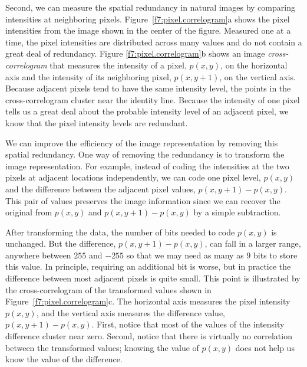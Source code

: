 Second, we can measure the spatial redundancy in natural images by
comparing intensities at neighboring pixels.
Figure~\ref{f7:pixel.correlogram}a shows the pixel intensities from
the image shown in the center of the figure.  Measured one at a time,
the pixel intensities are distributed across many values and do not
contain a great deal of redundancy.  Figure
\ref{f7:pixel.correlogram}b shows an image {\em cross-correlogram}
that measures the intensity of a pixel, $p(x,y)$, on the horizontal
axis and the intensity of its neighboring pixel, $p(x,y+1)$, on the
vertical axis.  Because adjacent pixels tend to have the same
intensity level, the points in the cross-correlogram cluster near the
identity line.  Because the intensity of one pixel tells us a great
deal about the probable intensity level of an adjacent pixel, we know
that the pixel intensity levels are redundant.

We can improve the efficiency of the image representation by removing
this spatial redundancy.  One way of removing the redundancy is to
transform the image representation.  For example, instead of coding
the intensities at the two pixels at adjacent locations independently,
we can code one pixel level, $p(x,y)$ and the difference between the
adjacent pixel values, $p(x,y+1) - p(x,y)$.  This pair of values
preserves the image information since we can recover the original from
$p(x,y)$ and $p(x,y+1)-p(x,y)$ by a simple subtraction.

After transforming the data, the number of bits needed to code
$p(x,y)$ is unchanged.  But the difference, $p(x,y+1)- p(x,y)$, can
fall in a larger range, anywhere between $255$ and $-255$ so that we may
need as many as $9$ bits to store this value.  In principle, requiring
an additional bit is worse, but in practice the difference between
most adjacent pixels is quite small.  This point is illustrated by the
cross-correlogram of the transformed values shown in
Figure~\ref{f7:pixel.correlogram}c.  The horizontal axis measures the
pixel intensity $p(x,y)$, and the vertical axis measures the
difference value, $p(x,y+1) - p(x,y)$.  First, notice that most of the
values of the intensity difference cluster near zero.  Second, notice
that there is virtually no correlation between the transformed values;
knowing the value of $p(x,y)$ does not help us know the value of the
difference.

